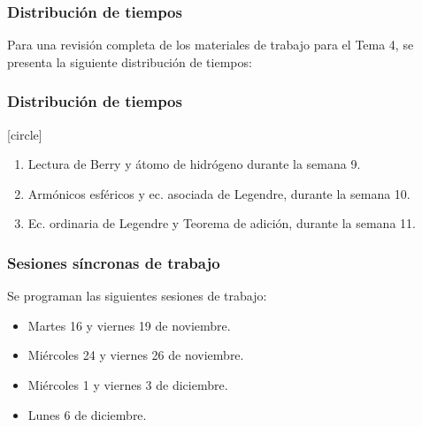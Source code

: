 \documentclass[12pt]{beamer}
\begin{document}
\begin{frame}
\frametitle{Distribución de tiempos}
Para una revisión completa de los materiales de trabajo para el Tema 4, se presenta la siguiente distribución de tiempos:
\end{frame}
\begin{frame}
\frametitle{Distribución de tiempos}
[circle]
\begin{enumerate}[<+->]
\item Lectura de Berry y átomo de hidrógeno durante la semana 9.
\item Armónicos esféricos y ec. asociada de Legendre, durante la semana 10.
\item Ec. ordinaria de Legendre y Teorema de adición, durante la semana 11.
\end{enumerate}
\end{frame}
\begin{frame}
\frametitle{Sesiones síncronas de trabajo}
Se programan las siguientes sesiones de trabajo:
\begin{itemize}[<+->]
\item Martes 16 y viernes 19 de noviembre.
\item Miércoles 24 y viernes 26 de noviembre.
\item Miércoles 1 y viernes 3 de diciembre.
\item Lunes 6 de diciembre.
\end{itemize}
\end{frame}
\end{document}
